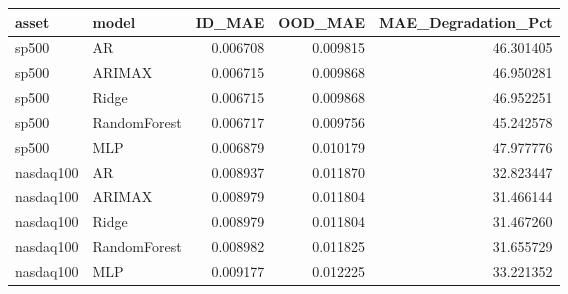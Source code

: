 \begin{tabular}{llrrr}
\toprule
asset & model & ID_MAE & OOD_MAE & MAE_Degradation_Pct \\
\midrule
sp500 & AR & 0.006708 & 0.009815 & 46.301405 \\
sp500 & ARIMAX & 0.006715 & 0.009868 & 46.950281 \\
sp500 & Ridge & 0.006715 & 0.009868 & 46.952251 \\
sp500 & RandomForest & 0.006717 & 0.009756 & 45.242578 \\
sp500 & MLP & 0.006879 & 0.010179 & 47.977776 \\
nasdaq100 & AR & 0.008937 & 0.011870 & 32.823447 \\
nasdaq100 & ARIMAX & 0.008979 & 0.011804 & 31.466144 \\
nasdaq100 & Ridge & 0.008979 & 0.011804 & 31.467260 \\
nasdaq100 & RandomForest & 0.008982 & 0.011825 & 31.655729 \\
nasdaq100 & MLP & 0.009177 & 0.012225 & 33.221352 \\
\bottomrule
\end{tabular}
